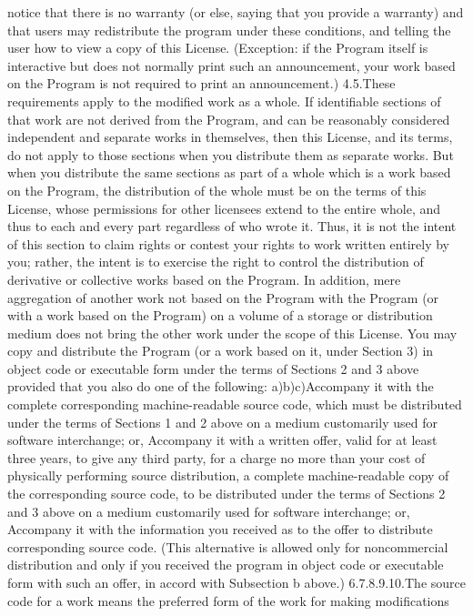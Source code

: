 \documentclass[12pt]{article}
\begin{document}
notice that there is no warranty (or else, saying that you provide a warranty) and that
users may redistribute the program under these conditions, and telling the user how
to view a copy of this License. (Exception: if the Program itself is interactive but does
not normally print such an announcement, your work based on the Program is not
required to print an announcement.)
4.5.These requirements apply to the modified work as a whole. If identifiable sections of that
work are not derived from the Program, and can be reasonably considered independent and
separate works in themselves, then this License, and its terms, do not apply to those
sections when you distribute them as separate works. But when you distribute the same
sections as part of a whole which is a work based on the Program, the distribution of the
whole must be on the terms of this License, whose permissions for other licensees extend to
the entire whole, and thus to each and every part regardless of who wrote it. Thus, it is not
the intent of this section to claim rights or contest your rights to work written entirely by you;
rather, the intent is to exercise the right to control the distribution of derivative or collective
works based on the Program. In addition, mere aggregation of another work not based on
the Program with the Program (or with a work based on the Program) on a volume of a
storage or distribution medium does not bring the other work under the scope of this
License.
You may copy and distribute the Program (or a work based on it, under Section 3) in object
code or executable form under the terms of Sections 2 and 3 above provided that you also
do one of the following:
a)b)c)Accompany it with the complete corresponding machine-readable source code, which
must be distributed under the terms of Sections 1 and 2 above on a medium
customarily used for software interchange; or,
Accompany it with a written offer, valid for at least three years, to give any third party,
for a charge no more than your cost of physically performing source distribution, a
complete machine-readable copy of the corresponding source code, to be distributed
under the terms of Sections 2 and 3 above on a medium customarily used for
software interchange; or,
Accompany it with the information you received as to the offer to distribute
corresponding source code. (This alternative is allowed only for noncommercial
distribution and only if you received the program in object code or executable form
with such an offer, in accord with Subsection b above.)
6.7.8.9.10.The source code for a work means the preferred form of the work for making modifications
\end{document}
